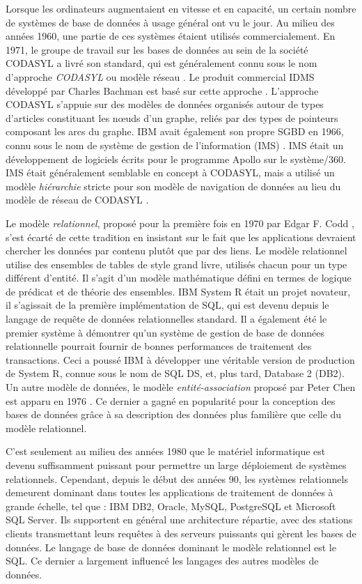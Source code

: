 Lorsque les ordinateurs augmentaient en vitesse et en capacité, un certain nombre de systèmes de base de données à usage général ont vu le jour. Au milieu des années 1960, une partie de ces systèmes étaient utilisés commercialement. En 1971, le groupe de travail sur les bases de données au sein de la société CODASYL a livré son standard, qui est généralement connu sous le nom d'approche \textit{CODASYL} ou modèle réseau \cite{Bachman73}. Le produit commercial IDMS développé par Charles Bachman est basé sur cette approche \cite{Warren75}. L'approche CODASYL s'appuie sur des modèles de données organisés autour de types d’articles constituant les nœuds d’un graphe, reliés par des types de pointeurs composant les arcs du graphe.
IBM avait également son propre SGBD en 1966, connu sous le nom de système de gestion de l'information (IMS) \cite{IMS20360}. IMS était un développement de logiciels écrits pour le programme Apollo sur le système/360. IMS était généralement semblable en concept à CODASYL, mais a utilisé un modèle \textit{hiérarchie} stricte pour son modèle de navigation de données au lieu du modèle de réseau de CODASYL \cite{Bachman73}.

Le modèle \textit{relationnel}, proposé pour la première fois en 1970 par Edgar F. Codd \cite{Codd70}, s'est écarté de cette tradition en insistant sur le fait que les applications devraient chercher les données par contenu plutôt que par des liens. Le modèle relationnel utilise des ensembles de tables de style grand livre, utilisés chacun pour un type différent d'entité. Il s'agit d'un modèle mathématique défini en termes de logique de prédicat et de théorie des ensembles. IBM System R \cite{Chamberlin81} était un projet novateur, il s'agissait de la première implémentation de SQL, qui est devenu depuis le langage de requête de données relationnelles standard. Il a également été le premier système à démontrer qu'un système de gestion de base de données relationnelle pourrait fournir de bonnes performances de traitement des transactions. Ceci a poussé IBM à développer une véritable version de production de System R, connue sous le nom de SQL DS, et, plus tard, Database 2 (DB2).
Un autre modèle de données, le modèle \textit{entité-association} proposé par Peter Chen est apparu en 1976 \cite{Chen1976}. Ce dernier a gagné en popularité pour la conception des bases de données grâce à sa description des données plus familière que celle du modèle relationnel.

C'est seulement au milieu des années 1980 que le matériel informatique est devenu suffisamment puissant pour permettre un large déploiement de systèmes relationnels. Cependant, depuis le début des années 90, les systèmes relationnels demeurent dominant dans toutes les applications de traitement de données à grande échelle, tel que : IBM DB2, Oracle, MySQL, PostgreSQL et Microsoft SQL Server. Ils supportent en général une architecture répartie, avec des stations clients transmettant leurs requêtes à des serveurs puissants qui gèrent les bases de données. Le langage de base de données dominant le modèle relationnel est le SQL. Ce dernier a largement influencé les langages des autres modèles de données.

